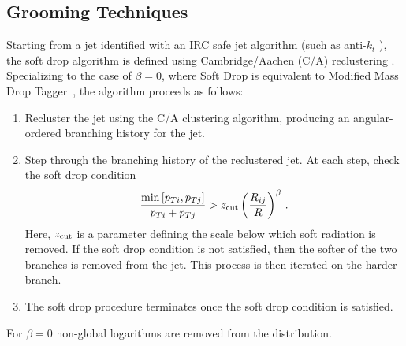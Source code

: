 
\subsection{Grooming Techniques}\label{sec:groom_tech}

Starting from a jet identified with an IRC safe jet algorithm (such as anti-$k_t$ \cite{Cacciari:2008gp}), the soft drop algorithm is defined using Cambridge/Aachen (C/A) reclustering \cite{Dokshitzer:1997in,Wobisch:1998wt,Wobisch:2000dk}.  Specializing to the case of $\beta=0$, where Soft Drop is equivalent to Modified Mass Drop Tagger~\cite{Dasgupta:2013ihk}, the algorithm proceeds as follows:
\begin{enumerate}

\item Recluster the jet using the C/A clustering algorithm, producing an angular-ordered branching history for the jet.

\item Step through the branching history of the reclustered jet.  At each step, check the soft drop condition
\begin{align}\label{eq:sd_cut}
\frac{\min\left[ p_{Ti}, p_{Tj}  \right]}{p_{Ti}+p_{Tj}}> z_{\rm cut} \left(   \frac{R_{ij}}{R}\right)^\beta \,.
\end{align}
Here, $z_{\rm cut}$ is a parameter defining the scale below which soft radiation is removed.  If the soft drop condition is not satisfied, then the softer of the two branches is removed from the jet.  This process is then iterated on the harder branch.

\item The soft drop procedure terminates once the soft drop condition is satisfied.

\end{enumerate}

For $\beta=0$ non-global logarithms are removed from the distribution.  





